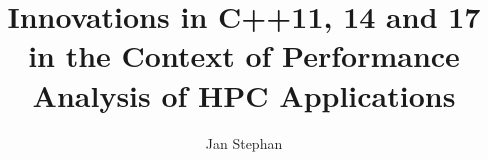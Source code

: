 \documentclass[utf8,hauptseminar]{zihpub}
\author{Jan Stephan}
\title{Innovations in C++11, 14 and 17 in the Context of Performance Analysis of HPC Applications}
\begin{document}







{}

\end{document}
